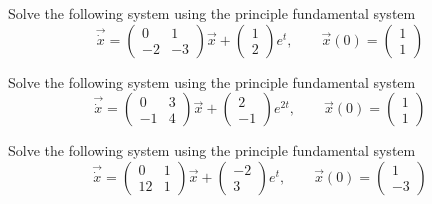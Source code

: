 \documentclass[a4paper,10pt]{book}
\begin{document}
\exercise \label{ex:ode8} Solve the following system using the principle fundamental system
\begin{equation*}
\vec{\dot{x}} = \begin{pmatrix} 0 & 1 \\ -2 & -3 \end{pmatrix} \vec{x} + \begin{pmatrix} 1 \\ 2 \end{pmatrix} e^t, 
\qquad \vec{x}(0) = \begin{pmatrix} 1 \\ 1 \end{pmatrix}
\end{equation*}

\exercise \label{ex:ode9} Solve the following system using the principle fundamental system
\begin{equation*}
\vec{\dot{x}} = \begin{pmatrix} 0 & 3 \\ -1 & 4 \end{pmatrix} \vec{x} + \begin{pmatrix} 2 \\ -1 \end{pmatrix} e^{2t}, 
\qquad \vec{x}(0) = \begin{pmatrix} 1 \\ 1 \end{pmatrix}
\end{equation*}

\exercise \label{ex:ode10} Solve the following system using the principle fundamental system
\begin{equation*}
\vec{\dot{x}} = \begin{pmatrix} 0 & 1 \\ 12 & 1 \end{pmatrix} \vec{x} + \begin{pmatrix} -2 \\ 3 \end{pmatrix} e^t, 
\qquad \vec{x}(0) = \begin{pmatrix} 1 \\ -3 \end{pmatrix}
\end{equation*}

\end{document}
